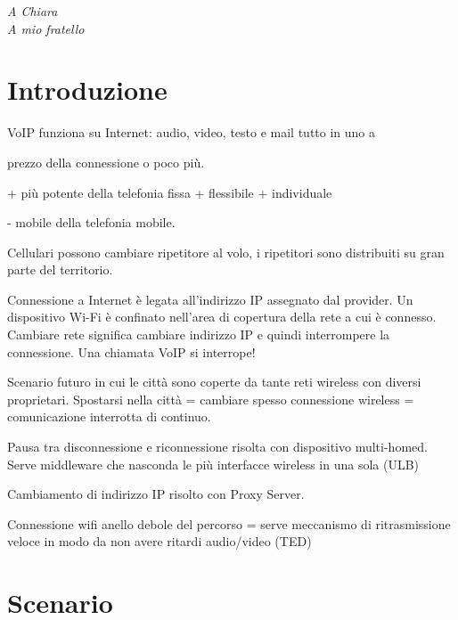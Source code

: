 \documentclass[12pt,a4paper,openright,twoside]{book}
\begin{document}
%
%
\begin{titlepage}
  \thispagestyle{empty}
  \topmargin=6.5cm
  \raggedleft
  \large
  \em A Chiara\\
  A mio fratello
\end{titlepage}


\chapter*{Introduzione}
VoIP funziona su Internet: audio, video, testo e mail tutto in uno a

prezzo della connessione o poco più.

+ più potente della telefonia fissa
+ flessibile
+ individuale

- mobile della telefonia mobile.

Cellulari possono cambiare ripetitore al volo, i ripetitori sono distribuiti
su gran parte del territorio.

Connessione a Internet è legata all'indirizzo IP assegnato dal provider.
Un dispositivo Wi-Fi è confinato nell'area di copertura della rete a cui è
connesso. Cambiare rete significa cambiare indirizzo IP e quindi
interrompere la connessione. Una chiamata VoIP si interrope!

Scenario futuro in cui le città sono coperte da tante reti wireless con
diversi proprietari. Spostarsi nella città = cambiare spesso connessione
wireless = comunicazione interrotta di continuo.

Pausa tra disconnessione e riconnessione risolta con dispositivo
multi-homed. Serve middleware che nasconda le più interfacce wireless in una
sola (ULB)

Cambiamento di indirizzo IP risolto con Proxy Server.

Connessione wifi anello debole del percorso = serve meccanismo di
ritrasmissione veloce in modo da non avere ritardi audio/video (TED)

\tableofcontents
\rhead[\fancyplain{}{\bfseries\leftmark}]{\fancyplain{}{\bfseries\thepage}}

\chapter{Scenario}
\lhead[\fancyplain{}{\bfseries\thepage}]{\fancyplain{}{\bfseries\rightmark}}
\end{document}
